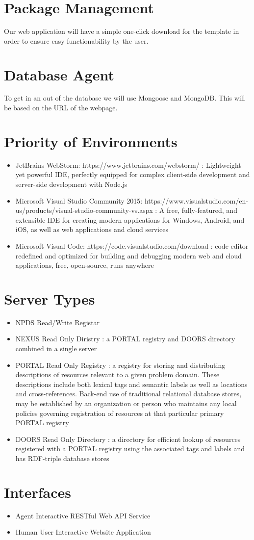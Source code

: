 \documentclass[12pt]{article}
\begin{document}
\section{Package Management}
Our web application will have a simple one-click download for the template in order to ensure easy functionability by the user.

\section{Database Agent}
To get in an out of the database we will use Mongoose and MongoDB. This will be based on the URL of the webpage.

\section{Priority of Environments}
\begin{itemize}
	\item{JetBrains WebStorm: https://www.jetbrains.com/webstorm/}
	: Lightweight yet powerful IDE, perfectly equipped for complex client-side development and server-side development with Node.js
	\item{Microsoft Visual Studio Community 2015: https://www.visualstudio.com/en-us/products/visual-studio-community-vs.aspx}
	: A free, fully-featured, and extensible IDE for creating modern applications for Windows, Android, and iOS,
as well as web applications and cloud services
	\item{Microsoft Visual Code: https://code.visualstudio.com/download}
	: code editor redefined and optimized for building and debugging modern web and cloud applications, free, open-source, runs anywhere
\end{itemize}

\section{Server Types}
\begin{itemize}
	\item{NPDS Read/Write Registar}
	\item{NEXUS Read Only Diristry}
	: a PORTAL registry and DOORS directory combined in a single server
	\item{PORTAL Read Only Registry}
	: a registry for storing and distributing descriptions of resources relevant to a given problem domain. These descriptions include both lexical tags and semantic labels as well as locations and cross-references. Back-end use of traditional relational database stores, may be established by an organization or person who maintains any local policies governing registration of resources at that particular primary PORTAL registry
	\item{DOORS Read Only Directory}
	: a directory for efficient lookup of  resources registered with a PORTAL registry using the associated tags and labels and has RDF-triple database stores
\end{itemize}

\section{Interfaces}
\begin{itemize}
	\item{Agent Interactive RESTful Web API Service}
	\item{Human User Interactive Website Application}
\end{itemize}
\end{document}
